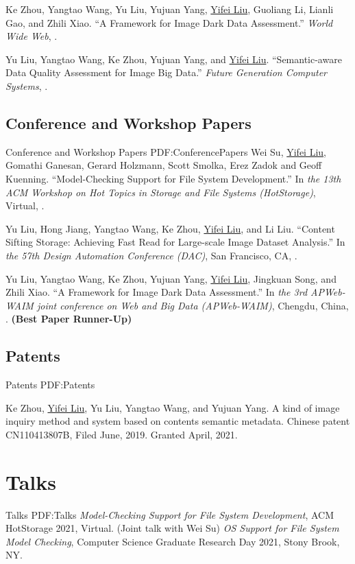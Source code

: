 \documentclass[letterpaper,10pt,oneside]{article}
\begin{document}
\begin{body}
\NumberedItem{[1]}
Ke Zhou, Yangtao Wang, Yu Liu, Yujuan Yang, \underline{Yifei Liu}, Guoliang Li, Lianli Gao, and Zhili Xiao.
``A Framework for Image Dark Data Assessment.'' 
\textit{World Wide Web},
.

\NumberedItem{[2]}
Yu Liu, Yangtao Wang, Ke Zhou, Yujuan Yang, and \underline{Yifei Liu}.
``Semantic-aware Data Quality Assessment for Image Big Data.'' 
\textit{Future Generation Computer Systems},
.

\subsection
{Conference and Workshop Papers}
{Conference and Workshop Papers}
{PDF:ConferencePapers}
\NumberedItem{[1]}
Wei Su, \underline{Yifei Liu}, Gomathi Ganesan, Gerard Holzmann, Scott Smolka, Erez Zadok and Geoff Kuenning.
``Model-Checking Support for File System Development.''
In \textit{the 13th ACM Workshop on Hot Topics in Storage and File Systems (HotStorage)}, Virtual,
.

\NumberedItem{[2]}
Yu Liu, Hong Jiang, Yangtao Wang, Ke Zhou, \underline{Yifei Liu}, and Li Liu.
``Content Sifting Storage: Achieving Fast Read for Large-scale Image Dataset Analysis.''
In \textit{the 57th Design Automation Conference (DAC)}, San Francisco, CA,
.

\NumberedItem{[3]}
Yu Liu, Yangtao Wang, Ke Zhou, Yujuan Yang, \underline{Yifei Liu}, Jingkuan Song, and Zhili Xiao.
``A Framework for Image Dark Data Assessment.''
In \textit{the 3rd APWeb-WAIM joint conference on Web and Big Data (APWeb-WAIM)}, Chengdu, China,
. \textbf{(Best Paper Runner-Up)}

\subsection
{Patents}
{Patents}
{PDF:Patents}

\NumberedItem{[1]}
Ke Zhou, \underline{Yifei Liu}, Yu Liu, Yangtao Wang, and Yujuan Yang. A kind of image inquiry method and system based on contents semantic metadata. Chinese patent CN110413807B, Filed June, 2019. Granted April, 2021.


\section
{Talks}
{Talks}
{PDF:Talks}
\BulletItem
\emph{Model-Checking Support for File System Development}, ACM HotStorage 2021, Virtual. (Joint talk with Wei Su)
\BulletItem
\emph{OS Support for File System Model Checking}, 
Computer Science Graduate Research Day 2021, Stony Brook, NY.



\end{body}
\end{document}
